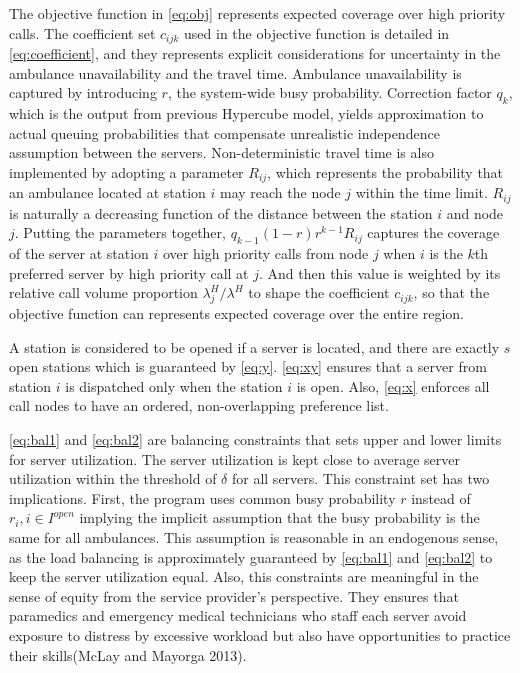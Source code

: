 \documentclass{article}
\begin{document}
The objective function in \eqref{eq:obj} represents expected coverage over high priority calls. The coefficient set $c_{ijk}$ used in the objective function is detailed in \eqref{eq:coefficient}, and they represents explicit considerations for uncertainty in the ambulance unavailability and the travel time. Ambulance unavailability is captured by introducing $r$, the system-wide busy probability. Correction factor $q_k$, which is the output from previous Hypercube model, yields approximation to actual queuing probabilities that compensate unrealistic independence assumption between the servers. Non-deterministic travel time is also implemented by adopting a parameter $R_{ij}$, which represents the probability that an ambulance located at station $i$ may reach the node $j$ within the time limit. $R_{ij}$ is naturally a decreasing function of the distance between the station $i$ and node $j$. Putting the parameters together, $q_{k-1}(1-r) r^{k-1} R_{ij}$ captures the coverage of the server at station $i$ over high priority calls from node $j$ when $i$ is the $k$th preferred server by high priority call at $j$. And then this value is weighted by its relative call volume proportion $\lambda_j^H/\lambda^H$ to shape the coefficient $c_{ijk}$, so that the objective function can represents expected coverage over the entire region.

A station is considered to be opened if a server is located, and there are exactly $s$ open stations which is guaranteed by \eqref{eq:y}. \eqref{eq:xy} ensures that a server from station $i$ is dispatched only when the station $i$ is open. Also, \eqref{eq:x} enforces all call nodes to have an ordered, non-overlapping preference list.

\eqref{eq:bal1} and \eqref{eq:bal2} are balancing constraints that sets upper and lower limits for server utilization. The server utilization is kept close to average server utilization within the threshold of $\delta$ for all servers. This constraint set has two implications. First, the program uses common busy probability $r$ instead of $r_i, i \in I^{open}$ implying the implicit assumption that the busy probability is the same for all ambulances. This assumption is reasonable in an endogenous sense, as the load balancing is approximately guaranteed by \eqref{eq:bal1} and \eqref{eq:bal2} to keep the server utilization equal. Also, this constraints are meaningful in the sense of equity from the service provider's perspective. They ensures that paramedics and emergency medical technicians who staff each server avoid exposure to distress by excessive workload but also have opportunities to practice their skills(McLay and Mayorga 2013).
\end{document}
